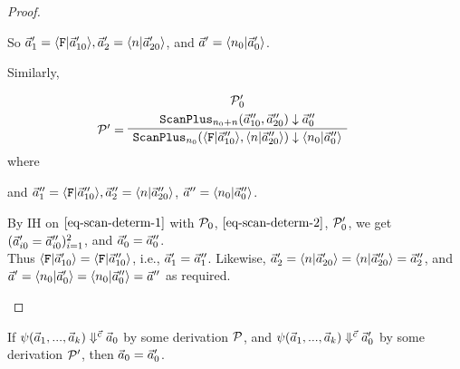 \begin{proof}
\begin{itemize}
\begin{itemize}
  	    So $\a_1' =  \<\F|\a'_{10} \'>, \a_2' = \<n|\a'_{20}\'>$,
  	    and $\a' = \<n_0|\a'_0\'>$.
  	    
  	    Similarly, 
  	    
  	    	$$\PT{\UCN{\MP_0'}{\blockf{\scan_{n_0+n}}{\a''_{10},\a''_{20}}{\a''_0}}
  	    	\LeLa{\MP' = }
  	    	\UC{\blockf{\scan_{n_0}}{\<\F|\a''_{10} \'>, \<n|\a''_{20}\'>}{\<n_0|\a''_0\'>}}
  	    }$$
  	    where  
      	
      	
      	and $\a_1'' =  \<\F|\a''_{10} \'>, \a_2'' = \<n|\a''_{20}\'>$, $\a'' = \<n_0|\a''_0\'>$.
      	
      	By IH on $\eqref{eq-scan-determ-1}$ with $\mathcal{P}_0$, 
      	$\eqref{eq-scan-determ-2}$, $\mathcal{P}_0'$, we get
      	$(\vec a'_{i0} = \vec a''_{i0})^2_{i=1}$, and $\vec a'_0 = \vec a''_0$. \\
      	Thus $\< \F |\a'_{10} \'> = \<\F | \a''_{10} \'>$, i.e., $\vec a'_1 = \vec a''_1$. 
      	Likewise, $\a'_2 = \<n|\a'_{20}\'> = \<n|\a''_{20}\'> = \a''_2$, and  $\a' = \<n_0|\a'_0\'> = \<n_0|\a''_0\'> = \a''$ as required. 
	  	
	  \end{itemize}
	
	\end{itemize}
\end{proof}


\begin{lem} \label{lem-xducer-determ}
	If $\psi(\vec a_1,...,\vec a_{k}) \Downarrow^{\vec c} \vec a_0$ by some derivation $\mathcal{P}$,
	and $\psi(\vec a_1,...,\vec a_{k}) \Downarrow^{\vec c} \vec a'_0$ by some derivation $\mathcal{P}'$,
	then $\vec a_0 = \vec a'_0$.
\end{lem}

